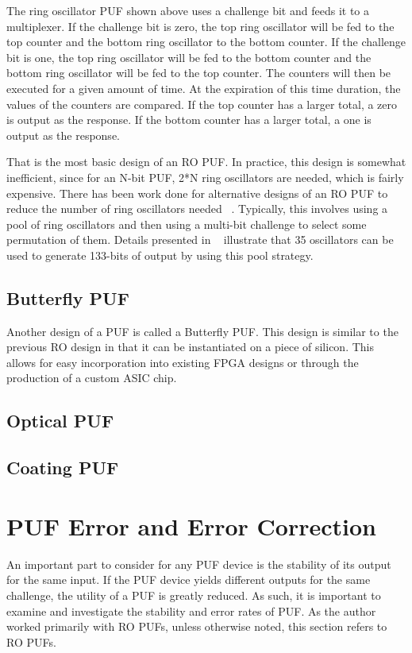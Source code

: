The ring oscillator PUF shown above uses a challenge bit and feeds it to a multiplexer.
If the challenge bit is zero, the top ring oscillator will be fed to the top counter and
the bottom ring oscillator to the bottom counter. If the challenge bit is one, the top
ring oscillator will be fed to the bottom counter and the bottom ring oscillator will
be fed to the top counter. The counters will then be executed for a given amount of time.
At the expiration of this time duration, the values of the counters are compared. If the
top counter has a larger total, a zero is output as the response. If the bottom counter
has a larger total, a one is output as the response.

That is the most basic design of an RO PUF. In practice, this design is somewhat 
inefficient, since for an N-bit PUF, 2*N ring oscillators are needed, which is fairly
expensive. There has been work done for alternative designs of
an RO PUF to reduce the number of ring oscillators needed ~\cite{aegis_pool}. 
Typically, this involves using
a pool of ring oscillators and then using a multi-bit challenge to select some permutation
of them. Details presented in ~\cite{aegis_pool} illustrate that 35 oscillators can
be used to generate 133-bits of output by using this pool strategy.

\subsection{Butterfly PUF}
Another design of a PUF is called a Butterfly PUF. This design is similar to the previous
RO design in that it can be instantiated on a piece of silicon. This allows for easy
incorporation into existing FPGA designs or through the production of a custom ASIC chip.



\subsection{Optical PUF}

\subsection{Coating PUF}


\section{PUF Error and Error Correction}
An important part to consider for any PUF device is the stability of its output for
the same input. If the PUF device yields different outputs for the same challenge, the
utility of a PUF is greatly reduced. As such, it is important to examine and investigate
the stability and error rates of PUF. As the author worked primarily with RO PUFs, unless
otherwise noted, this section refers to RO PUFs.

